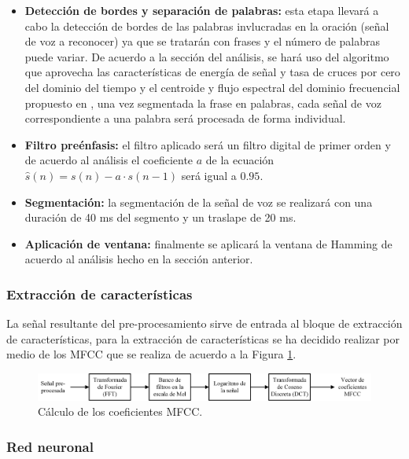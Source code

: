 	\begin{itemize}
		\item	\textbf{Detección de bordes y separación de palabras:} esta etapa llevará a cabo la detección de bordes de las palabras invlucradas en la oración (señal de voz a reconocer) ya que se tratarán con frases y el número de palabras puede variar. De acuerdo a la sección del análisis, se hará uso del algoritmo que aprovecha las características de energía de señal y tasa de cruces por cero del dominio del tiempo y el centroide y flujo espectral del dominio frecuencial propuesto en \cite{A31}, una vez segmentada la frase en palabras, cada señal de voz correspondiente a una palabra será procesada de forma individual.
		\item	\textbf{Filtro preénfasis:} el filtro aplicado será un filtro digital de primer orden y de acuerdo al análisis el coeficiente $a$ de la ecuación $\hat{s}(n)=s(n)-a\cdot s(n-1)$ será igual a $0.95$.
		\item	\textbf{Segmentación:} la segmentación de la señal de voz se realizará con una duración de 40 ms del segmento y un traslape de 20 ms.
		\item	\textbf{Aplicación de ventana:} finalmente se aplicará la ventana de Hamming de acuerdo al análisis hecho en la sección anterior.
	\end{itemize}
	
	\subsubsection*{Extracción de características}
	
	La señal resultante del pre-procesamiento sirve de entrada al bloque de extracción de características, para la extracción de características se ha decidido realizar por medio de los MFCC que se realiza de acuerdo a la Figura \ref{fig:extraccionMFCC}.
	
		\begin{figure}[H]
			\centering
			\includegraphics[width=1\linewidth]{figures/extraccionMFCC}
			\caption{Cálculo de los coeficientes MFCC.}
			\label{fig:extraccionMFCC}
		\end{figure}

	\subsubsection*{Red neuronal}
		
